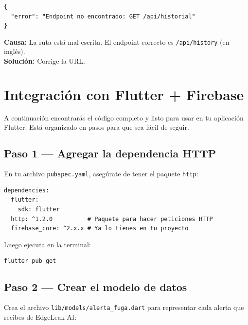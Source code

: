 \documentclass[12pt, a4paper]{article}
\begin{document}
\begin{tcolorbox}[errorbox, title={\faTimesCircle\ Error 404 — Endpoint no encontrado}]
\begin{lstlisting}[style=jsonStyle]
{
  "error": "Endpoint no encontrado: GET /api/historial"
}
\end{lstlisting}
  \vspace{0.2cm}
  \textbf{Causa:} La ruta está mal escrita. El endpoint correcto es \texttt{/api/history} (en inglés).\\
  \textbf{Solución:} Corrige la URL.
\end{tcolorbox}

\section{Integración con Flutter + Firebase}

A continuación encontrarás el código completo y listo para usar en tu
aplicación Flutter. Está organizado en pasos para que sea fácil de seguir.

\subsection{Paso 1 — Agregar la dependencia HTTP}

En tu archivo \texttt{pubspec.yaml}, asegúrate de tener el paquete \texttt{http}:

\begin{lstlisting}[style=dartStyle, caption={pubspec.yaml}]
dependencies:
  flutter:
    sdk: flutter
  http: ^1.2.0          # Paquete para hacer peticiones HTTP
  firebase_core: ^2.x.x # Ya lo tienes en tu proyecto
\end{lstlisting}

Luego ejecuta en la terminal:

\begin{lstlisting}[style=httpStyle]
flutter pub get
\end{lstlisting}

\subsection{Paso 2 — Crear el modelo de datos}

Crea el archivo \texttt{lib/models/alerta\_fuga.dart} para representar
cada alerta que recibes de EdgeLeak AI:
\end{document}
